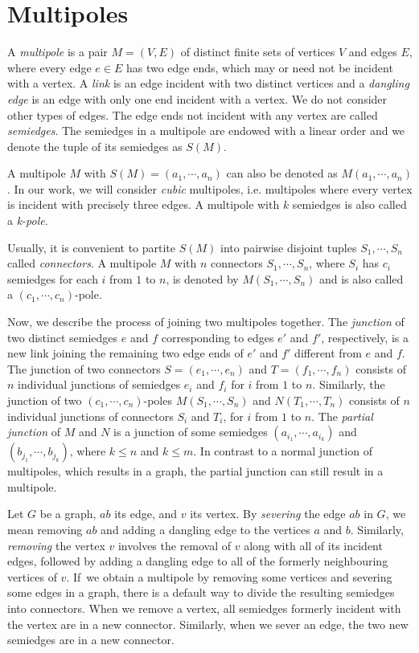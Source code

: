 \section{Multipoles}
\label{sec:multipoles}

A \textit{multipole} is a pair $M=(V,E)$ of distinct finite sets of vertices $V$ and edges $E$, where every edge $e\in E$ has two edge ends, which may or need not be incident with a vertex. A \emph{link} is an edge incident with two distinct vertices and a \emph{dangling edge} is an edge with only one end incident with a vertex. We do not consider other types of edges. The edge ends not incident with any vertex are called \textit{semiedges}. The semiedges in a multipole are endowed with a linear order and we denote the tuple of its semiedges as $S(M)$.

A multipole $M$ with $S(M) = (a_1, \cdots, a_n)$ can also be denoted as $M(a_1,\cdots,a_n)$. In our work, we will consider \textit{cubic} multipoles, i.e. multipoles where every vertex is incident with precisely three edges. 
A multipole with $k$ semiedges is also called a \textit{k-pole}. 

Usually, it is convenient to partite $S(M)$ into pairwise disjoint tuples $S_1,\cdots, S_n$ called \textit{connectors}.
A multipole $M$ with $n$ connectors $S_1,\cdots,S_n$, where $S_i$ has $c_i$ semiedges for each $i$ from $1$ to $n$, is denoted by $M(S_1,\cdots,S_n)$ and is also called a $(c_1,\cdots,c_n)$-pole.

Now, we describe the process of joining two multipoles together.
The \textit{junction} of two distinct semiedges $e$ and $f$ corresponding to edges $e'$ and $f'$, respectively, is a new link joining the remaining two edge ends of $e'$ and $f'$ different from $e$ and $f$.
The junction of two connectors $S=(e_1,\cdots,e_n)$ and $T=(f_1,\cdots,f_n)$ consists of $n$ individual junctions of semiedges $e_i$ and $f_i$ for $i$ from $1$ to $n$.
Similarly, the junction of two $(c_1,\cdots,c_n)$-poles $M(S_1,\cdots,S_n)$ and $N(T_1,\cdots,T_n)$ consists of $n$ individual junctions of connectors $S_i$ and $T_i$, for $i$ from $1$ to $n$.
The \textit{partial junction} of $M$ and $N$ is a junction of some semiedges $(a_{i_1},\cdots, a_{i_k})$ and $(b_{j_1},\cdots, b_{j_k})$, where $k\leq n$ and $k\leq m$. In contrast to a normal junction of multipoles, which results in a graph, the partial junction can still result in a multipole.

Let $G$ be a graph, $ab$ its edge, and $v$ its vertex. By \textit{severing} the edge $ab$ in $G$, we mean removing $ab$ and adding a dangling edge to the vertices $a$ and $b$. Similarly, \textit{removing} the vertex $v$ involves the removal of $v$ along with all of its incident edges, followed by adding a dangling edge to all of the formerly neighbouring vertices of $v$. If~we obtain a multipole by removing some vertices and severing some edges in a graph, there is a default way to divide the resulting semiedges into connectors. When we remove a vertex, all semiedges formerly incident with the vertex are in a new connector. Similarly, when we sever an edge, the two new semiedges are in a new connector.


